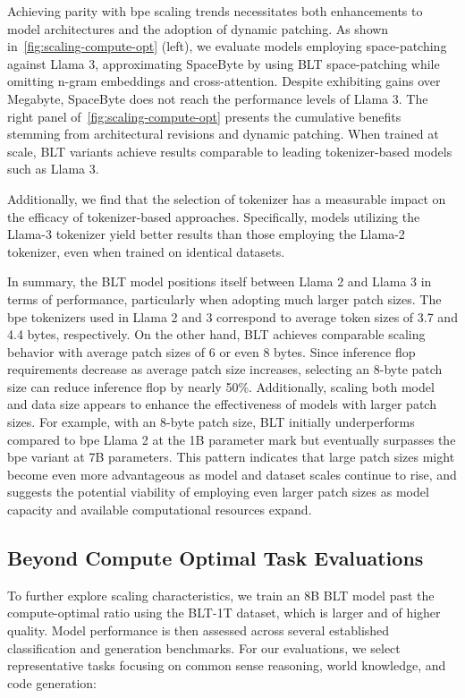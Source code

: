 Achieving parity with bpe scaling trends necessitates both enhancements to model architectures and the adoption of dynamic patching. As shown in~\autoref{fig:scaling-compute-opt} (left), we evaluate models employing space-patching against Llama 3, approximating SpaceByte \citep{slagle2024spacebyte} by using {\textsc BLT} space-patching while omitting n-gram embeddings and cross-attention. Despite exhibiting gains over Megabyte, SpaceByte does not reach the performance levels of Llama 3. The right panel of~\autoref{fig:scaling-compute-opt} presents the cumulative benefits stemming from architectural revisions and dynamic patching. When trained at scale, {\textsc BLT} variants achieve results comparable to leading tokenizer-based models such as Llama 3.

Additionally, we find that the selection of tokenizer has a measurable impact on the efficacy of tokenizer-based approaches. Specifically, models utilizing the Llama-3 tokenizer yield better results than those employing the Llama-2 tokenizer, even when trained on identical datasets.

In summary, the {\textsc BLT} model positions itself between Llama 2 and Llama 3 in terms of performance, particularly when adopting much larger patch sizes. The bpe tokenizers used in Llama 2 and 3 correspond to average token sizes of 3.7 and 4.4 bytes, respectively. On the other hand, {\textsc BLT} achieves comparable scaling behavior with average patch sizes of 6 or even 8 bytes. Since inference flop requirements decrease as average patch size increases, selecting an 8-byte patch size can reduce inference flop by nearly 50\%. Additionally, scaling both model and data size appears to enhance the effectiveness of models with larger patch sizes. For example, with an 8-byte patch size, {\textsc BLT} initially underperforms compared to bpe Llama 2 at the 1B parameter mark but eventually surpasses the bpe variant at 7B parameters. This pattern indicates that large patch sizes might become even more advantageous as model and dataset scales continue to rise, and suggests the potential viability of employing even larger patch sizes as model capacity and available computational resources expand.

\subsection{Beyond Compute Optimal Task Evaluations}
\label{section:evals}
To further explore scaling characteristics, we train an 8B {\textsc BLT} model past the compute-optimal ratio using the {\textsc BLT}-1T dataset, which is larger and of higher quality. Model performance is then assessed across several established classification and generation benchmarks. For our evaluations, we select representative tasks focusing on common sense reasoning, world knowledge, and code generation:
